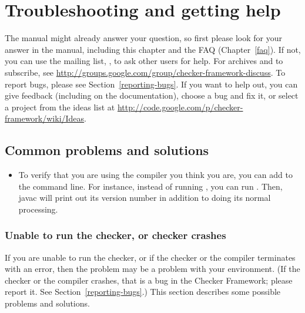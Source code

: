 \htmlhr
\chapter{Troubleshooting and getting help\label{troubleshooting}}

\begin{sloppypar}
The manual might already answer your question, so first please look for
your answer in the manual,
including this chapter and the FAQ (Chapter~\ref{faq}).
If not, you can use the mailing list,
, to ask other users for
help.  For archives and to subscribe, see \url{http://groups.google.com/group/checker-framework-discuss}.
To report bugs, please see Section~\ref{reporting-bugs}.
If you want to help out, you can give feedback (including on the
documentation), choose a bug and fix it, or select a
project from the ideas list at
\url{http://code.google.com/p/checker-framework/wiki/Ideas}.
\end{sloppypar}


\section{Common problems and solutions\label{common-problems}}

\begin{itemize}
\item
To verify that you are using the compiler you think you are, you can add
 to the command line.  For instance, instead of running
, you can run .  Then, javac will print out its version number in addition
to doing its normal processing.

\end{itemize}



\subsection{Unable to run the checker, or checker crashes\label{common-problems-running}}

If you are unable to run the checker, or if the checker or the compiler
terminates with an error, then the problem may be a problem with your environment.
(If the checker or the compiler crashes, that is a bug in the Checker
Framework; please report it.  See Section~\ref{reporting-bugs}.)
This section describes some possible problems and solutions.


